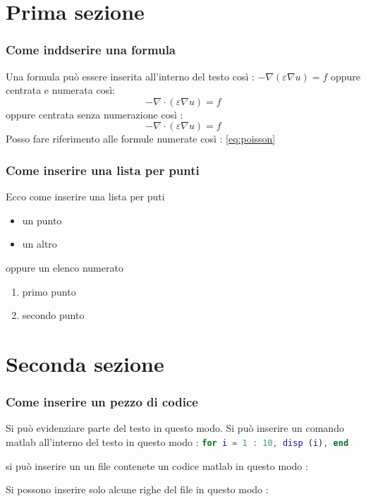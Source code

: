 \documentclass[10pt]{beamer}
\begin{document}
\section{Prima sezione}\label{sec:sec1}

\begin{frame} \frametitle{Come inddserire una formula}
Una formula può essere inserita all'interno del testo così : 
$-\nabla \left( \varepsilon \nabla u \right) = f $ oppure 
centrata e numerata così:
\begin{equation}\label{eq:poisson}
    -\nabla \cdot \left( \varepsilon \nabla u \right) = f
\end{equation}
oppure centrata senza numerazione così :
$$
 -\nabla \cdot \left( \varepsilon \nabla u \right) = f
$$
Posso fare riferimento alle formule numerate così : \eqref{eq:poisson}
\end{frame}

\begin{frame} \frametitle{Come inserire una lista per punti}
Ecco come inserire una lista per puti
\begin{itemize}
    \item un punto
    \item un altro
\end{itemize}
oppure un elenco numerato
\begin{enumerate}
    \item primo punto
    \item secondo punto
\end{enumerate}

\end{frame}

\section{Seconda sezione}\label{sec:sec2}

\begin{frame} \frametitle{Come inserire un pezzo di codice}
Si può evidenziare \alert{parte del testo} in questo modo.
%
Si può inserire un comando matlab all'interno del testo
in questo modo : \lstinline[language=Matlab]{for i = 1 : 10, disp (i), end}

si può inserire un un file contenete un codice matlab in questo modo :


Si possono inserire solo alcune righe del file in questo modo :


\end{frame}
\end{document}
